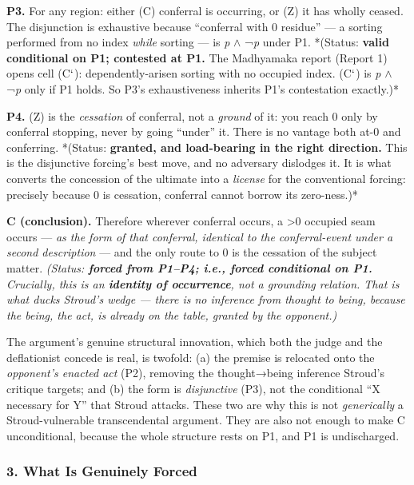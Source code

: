 \documentclass[11pt]{article}
\begin{document}
\textbf{P3.} For any region: either (C) conferral is occurring, or (Z) it has wholly ceased. The disjunction is exhaustive because ``conferral with 0 residue'' — a sorting performed from no index \emph{while} sorting — is \emph{p} \ensuremath{\wedge} ¬\emph{p} under P1. *(Status: \textbf{valid conditional on P1; contested at P1.} The Madhyamaka report (Report 1) opens cell (C\ensuremath{`}): dependently-arisen sorting with no occupied index. (C\ensuremath{`}) is \emph{p} \ensuremath{\wedge} ¬\emph{p} only if P1 holds. So P3's exhaustiveness inherits P1's contestation exactly.)*

\textbf{P4.} (Z) is the \emph{cessation} of conferral, not a \emph{ground} of it: you reach 0 only by conferral stopping, never by going ``under'' it. There is no vantage both at-0 and conferring. *(Status: \textbf{granted, and load-bearing in the right direction.} This is the disjunctive forcing's best move, and no adversary dislodges it. It is what converts the concession of the ultimate into a \emph{license} for the conventional forcing: precisely because 0 is cessation, conferral cannot borrow its zero-ness.)*

\textbf{C (conclusion).} Therefore wherever conferral occurs, a >0 occupied seam occurs — \emph{as the form of that conferral, identical to the conferral-event under a second description} — and the only route to 0 is the cessation of the subject matter. \emph{(Status: \textbf{forced from P1–P4; i.e., forced conditional on P1.} Crucially, this is an \textbf{identity of occurrence}, not a grounding relation. That is what ducks Stroud's wedge — there is no inference from thought to being, because the being, the act, is already on the table, granted by the opponent.)}

The argument's genuine structural innovation, which both the judge and the deflationist concede is real, is twofold: (a) the premise is relocated onto the \emph{opponent's enacted act} (P2), removing the thought→being inference Stroud's critique targets; and (b) the form is \emph{disjunctive} (P3), not the conditional ``X necessary for Y'' that Stroud attacks. These two are why this is not \emph{generically} a Stroud-vulnerable transcendental argument. They are also not enough to make C unconditional, because the whole structure rests on P1, and P1 is undischarged.

\subsubsection*{3. What Is Genuinely Forced}
\end{document}
